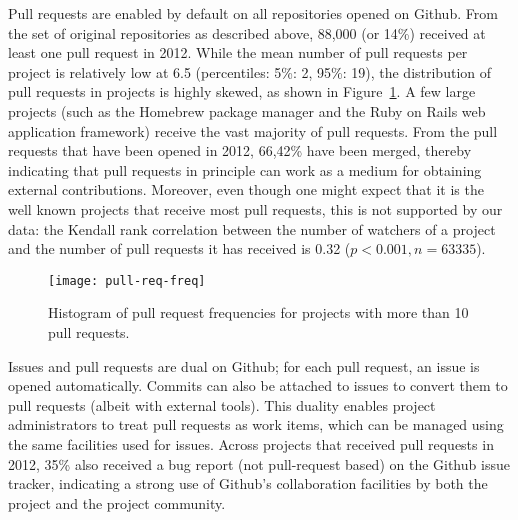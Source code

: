 \documentclass{sig-alternate}
\begin{document}
Pull requests are enabled by default on all repositories opened on Github.  From
the set of original repositories as described above, 88,000 (or 14\%) received
at least one pull request in 2012.  While the mean number of pull requests per
project is relatively low at 6.5 (percentiles: 5\%: 2, 95\%: 19), the
distribution of pull requests in projects is highly skewed, as shown in
Figure~\ref{fig:prfreq}.  A few large projects (such as the Homebrew package
manager and the Ruby on Rails web application framework) receive the vast
majority of pull requests. From the pull requests that have been opened in
2012, 66,42\% have been merged, thereby indicating that pull requests in
principle can work as a medium for obtaining external contributions.  Moreover,
even though one might expect that it is the well known projects that receive
most pull requests, this is not supported by our data: the Kendall rank
correlation between the number of watchers of a project and the number of pull
requests it has received is 0.32 ($p < 0.001, n = 63335$).

\begin{figure}
  \begin{center}
    \texttt{[image: pull-req-freq]}
  \end{center}
  \caption{Histogram of pull request frequencies for projects with more than
  10 pull requests.}
  \label{fig:prfreq}
\end{figure}

Issues and pull requests are dual on Github; for each pull request, an issue is
opened automatically. Commits can also be attached to issues to convert them to
pull requests (albeit with external tools). This duality enables project
administrators to treat pull requests as work items, which can be managed using
the same facilities used for issues. Across projects that received pull
requests in 2012, 35\% also received a bug report (not pull-request based) 
on the Github issue tracker, indicating a strong use of Github's collaboration
facilities by both the project and the project community.
\end{document}
